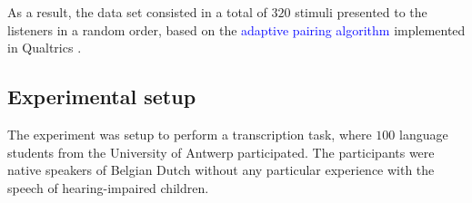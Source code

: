 As a result, the data set consisted in a total of $320$ stimuli presented to the listeners in a random order, based on the \textcolor{blue}{adaptive pairing algorithm} \citep{Pollitt_2012b} implemented in Qualtrics \cite{Qualtrics_2005}.
%
\begin{comment}
under the Design of Experiments (DoE) literature, we would say we have $32$ experimental units with $10$ replicate runs each, making a total of $320$ experimental runs. As it is defined in \citet{Lawson_2015}, an experimental unit is the item under study upon which something is changed, while a replicate run is the experiment conducted with the same factor settings, but using different experimental units. 
\end{comment}
%
\begin{comment}
evidence suggest that the number of comparisons and pairing algorithm impacts the reliability, validity and efficiency of the procedure \citep{Bramley_2015, Bramley_et_al_2018, Lesterhuis_2018, Verhavert_et_al_2019}. However, this is not investigated in the current research.
\end{comment}
%
\begin{comment}
Similar designs were used by \citet{Boonen_et_al_2020} and \citet{Faes_et_al_2021}. However, in the former case the number of samples were low, while in the latter, the design was unbalanced and not conducive to appropriate inferences from the pairwise comparisons.
\end{comment}
%
\begin{comment}
	\textbf{for the experimenter:} Based on \citet{Faes_et_al_2021} we depict the procedure for the experimenter:
	\begin{enumerate}
		\item 1. matching procedure 
		\item selection of suitable stimuli
		\item determine the number of stimuli per judge 
	\end{enumerate}	
\end{comment}
%
%
\subsection{Experimental setup} \label{sS:setup}
%
The experiment was setup to perform a transcription task, where $100$ language students from the University of Antwerp participated. The participants were native speakers of Belgian Dutch without any particular experience with the speech of hearing-impaired children.

